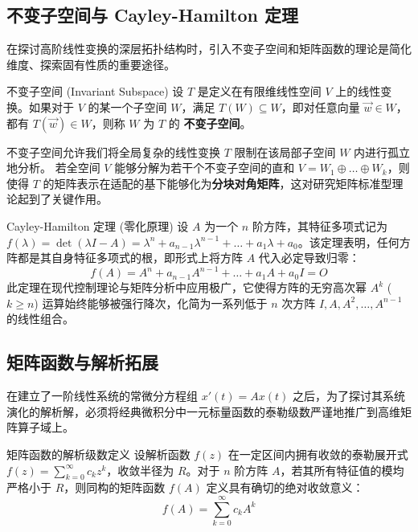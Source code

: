 \documentclass[a4paper,12pt]{ctexart}
\begin{document}
\subsection{不变子空间与 Cayley-Hamilton 定理}

在探讨高阶线性变换的深层拓扑结构时，引入不变子空间和矩阵函数的理论是简化维度、探索固有性质的重要途径。

\begin{mydef}{不变子空间 (Invariant Subspace)}{}
    设 $T$ 是定义在有限维线性空间 $V$ 上的线性变换。如果对于 $V$ 的某一个子空间 $W$，满足 $T(W) \subseteq W$，即对任意向量 $\vec{w} \in W$，都有 $T(\vec{w}) \in W$，则称 $W$ 为 $T$ 的 \textbf{不变子空间}。
    
    不变子空间允许我们将全局复杂的线性变换 $T$ 限制在该局部子空间 $W$ 内进行孤立地分析。
    若全空间 $V$ 能够分解为若干个不变子空间的直和 $V = W_1 \oplus \dots \oplus W_k$，则使得 $T$ 的矩阵表示在适配的基下能够化为\textbf{分块对角矩阵}，这对研究矩阵标准型理论起到了关键作用。
\end{mydef}

\begin{mythm}{Cayley-Hamilton 定理 (零化原理)}{}
    设 $A$ 为一个 $n$ 阶方阵，其特征多项式记为 $f(\lambda) = \det(\lambda I - A) = \lambda^n + a_{n-1}\lambda^{n-1} + \dots + a_1\lambda + a_0$。该定理表明，任何方阵都是其自身特征多项式的根，即形式上将方阵 $A$ 代入必定导致归零：
    \[
    f(A) = A^n + a_{n-1}A^{n-1} + \dots + a_1 A + a_0 I = O
    \]
    此定理在现代控制理论与矩阵分析中应用极广，它使得方阵的无穷高次幂 $A^k$ ($k \ge n$) 运算始终能够被强行降次，化简为一系列低于 $n$ 次方阵 $I, A, A^2, \dots, A^{n-1}$ 的线性组合。
\end{mythm}

\subsection{矩阵函数与解析拓展}

在建立了一阶线性系统的常微分方程组 $x'(t) = A x(t)$ 之后，为了探讨其系统演化的解析解，必须将经典微积分中一元标量函数的泰勒级数严谨地推广到高维矩阵算子域上。

\begin{mydef}{矩阵函数的解析级数定义}{}
    设解析函数 $f(z)$ 在一定区间内拥有收敛的泰勒展开式 $f(z) = \sum_{k=0}^\infty c_k z^k$，收敛半径为 $R$。对于 $n$ 阶方阵 $A$，若其所有特征值的模均严格小于 $R$，则同构的矩阵函数 $f(A)$ 定义具有确切的绝对收敛意义：
    \[
    f(A) = \sum_{k=0}^\infty c_k A^k
    \]
\end{mydef}
\end{document}
